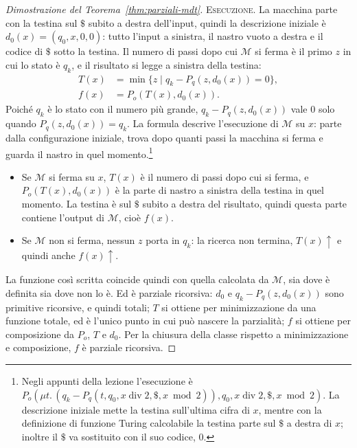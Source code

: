 \documentclass[a4paper, 11pt, oneside]{book}
\theoremstyle{formale}
\begin{document}
\begin{proof}[Dimostrazione del Teorema~\ref{thm:parziali-mdt}]
        \medskip
        \textsc{Esecuzione}. La macchina parte con la testina sul $\$$ subito a destra
        dell'input, quindi la descrizione iniziale \`e $d_0(x) = (q_0, x, 0, 0)$: tutto
        l'input a sinistra, il nastro vuoto a destra e il codice di $\$$ sotto la
        testina. Il numero di passi dopo cui $\mathcal{M}$ si ferma \`e il primo $z$ in
        cui lo stato \`e $q_k$, e il risultato si legge a sinistra della testina:
        \begin{align*}
            T(x) &= \min \{z \mid q_k - P_q(z, d_0(x)) = 0\}, \\
            f(x) &= P_o(T(x), d_0(x)).
        \end{align*}
        Poich\'e $q_k$ \`e lo stato con il numero pi\`u grande, $q_k - P_q(z, d_0(x))$
        vale $0$ solo quando $P_q(z, d_0(x)) = q_k$.
        La formula descrive l'esecuzione di $\mathcal{M}$ su $x$: parte dalla
        configurazione iniziale, trova dopo quanti passi la macchina si ferma e guarda il
        nastro in quel momento.\footnote{Negli appunti della lezione l'esecuzione \`e
        $P_o(\mu t.\, (q_k - P_q(t, q_0, x \operatorname{div} 2, \$,
        x \bmod 2)), q_0, x \operatorname{div} 2, \$, x \bmod 2)$. La descrizione
        iniziale mette la testina sull'ultima cifra di $x$, mentre con la definizione di
        funzione Turing calcolabile la testina parte sul $\$$ a destra di $x$; inoltre il
        $\$$ va sostituito con il suo codice, $0$.}
        \begin{itemize}
            \item Se $\mathcal{M}$ si ferma su $x$, $T(x)$ \`e il numero di passi dopo cui
                si ferma, e $P_o(T(x), d_0(x))$ \`e la parte di nastro a sinistra della
                testina in quel momento. La testina \`e sul $\$$ subito a destra del
                risultato, quindi questa parte contiene l'output di $\mathcal{M}$, cio\`e
                $f(x)$.
            \item Se $\mathcal{M}$ non si ferma, nessun $z$ porta in $q_k$: la ricerca non
                termina, $T(x)\uparrow$ e quindi anche $f(x)\uparrow$.
        \end{itemize}
        La funzione cos\`i scritta coincide quindi con quella calcolata da
        $\mathcal{M}$, sia dove \`e definita sia dove non lo \`e. Ed \`e parziale
        ricorsiva: $d_0$ e $q_k - P_q(z, d_0(x))$ sono primitive ricorsive, e quindi
        totali; $T$ si ottiene per minimizzazione da una funzione totale, ed \`e l'unico
        punto in cui pu\`o nascere la parzialit\`a; $f$ si ottiene per composizione da
        $P_o$, $T$ e $d_0$. Per la chiusura della classe rispetto a minimizzazione e
        composizione, $f$ \`e parziale ricorsiva.


\end{proof}
\end{document}
